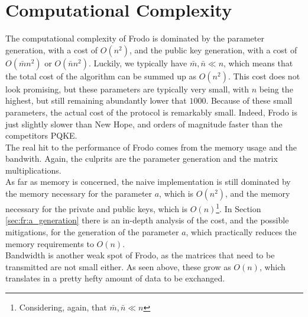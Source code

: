 



\section{Computational Complexity}
The computational complexity of Frodo is dominated by the parameter generation, with a cost of $O(n^2)$, and the public key generation, with a cost of $O(\bar{m}n^2)$ or $O(\bar{n}n^2)$. Luckily, we typically have $\bar{m},\bar{n} \ll n$, which means that the total cost of the algorithm can be summed up as $O(n^2)$. This cost does not look promising, but these parameters are typically very small, with $n$ being the highest, but still remaining abundantly lower that $1000$. Because of these small parameters, the actual cost of the protocol is remarkably small. Indeed, Frodo is just slightly slower than New Hope, and orders of magnitude faster than the competitors PQKE.\\
The real hit to the performance of Frodo comes from the memory usage and the bandwith. Again, the culprits are the parameter generation and the matrix multiplications.\\
As far as memory is concerned, the naive implementation is still dominated by the memory necessary for the parameter $a$, which is $O(n^2)$, and the memory necessary for the private and public keys, which is $O(n)$\footnote{Considering, again, that $\bar{m},\bar{n} \ll n$}. In Section \ref{sec:fr:a_generation} there is an in-depth analysis of the cost, and the possible mitigations, for the generation of the parameter $a$, which practically reduces the memory requirements to $O(n)$.\\
Bandwidth is another weak spot of Frodo, as the matrices that need to be transmitted are not small either. As seen above, these grow as $O(n)$, which translates in a pretty hefty amount of data to be exchanged.\\

